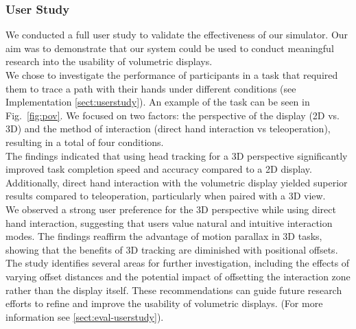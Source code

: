 \subsubsection{User Study}

We conducted a full user study to validate the effectiveness of our simulator. Our aim was to demonstrate that our system could be used to conduct meaningful research into the usability of volumetric displays. \\

We chose to investigate the performance of participants in a task that required them to trace a path with their hands under different conditions (see Implementation \ref{sect:userstudy}). An example of the task can be seen in Fig.~\ref{fig:pov}. We focused on two factors: the perspective of the display (2D vs. 3D) and the method of interaction (direct hand interaction vs teleoperation), resulting in a total of four conditions. \\

The findings indicated that using head tracking for a 3D perspective significantly improved task completion speed and accuracy compared to a 2D display. Additionally, direct hand interaction with the volumetric display yielded superior results compared to teleoperation, particularly when paired with a 3D view. \\

We observed a strong user preference for the 3D perspective while using direct hand interaction, suggesting that users value natural and intuitive interaction modes. The findings reaffirm the advantage of motion parallax in 3D tasks, showing that the benefits of 3D tracking are diminished with positional offsets. \\

The study identifies several areas for further investigation, including the effects of varying offset distances and the potential impact of offsetting the interaction zone rather than the display itself. These recommendations can guide future research efforts to refine and improve the usability of volumetric displays. (For more information see \ref{sect:eval-userstudy}).

